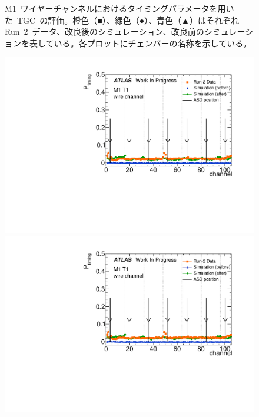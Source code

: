 \begin{figure}[htbp]
\begin{minipage}{0.49\hsize}
			\end{minipage}
		\caption[M1~ワイヤーチャンネルにおけるタイミングパラメータを用いた~TGC~の評価。]{M1~ワイヤーチャンネルにおけるタイミングパラメータを用いた~TGC~の評価。橙色（■）、緑色（●）、青色（▲）はそれぞれRun~2~データ、改良後のシミュレーション、改良前のシミュレーションを表している。各プロットにチェンバーの名称を示している。}
		\label{fig:timingPlotCompWireM1}
	\end{figure}
	
	\begin{figure}[htbp]
         \begin{minipage}{0.49\hsize}
        \centering
        \includegraphics[width=\textwidth,page=12]{img/pdf5/master_timingplot_comp.pdf}
		\end{minipage}
		\begin{minipage}{0.49\hsize}
		\centering
		\includegraphics[width=\textwidth,page=14]{img/pdf5/master_timingplot_comp.pdf}

\end{minipage}
\end{figure}
